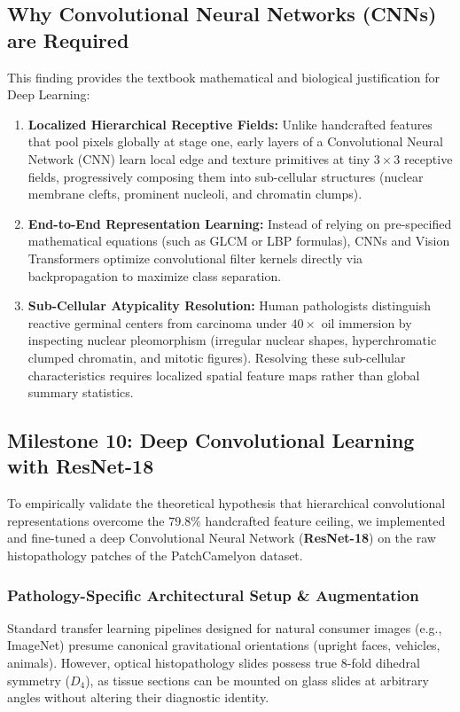 \documentclass[11pt,a4paper]{article}
\begin{document}
\subsection{Why Convolutional Neural Networks (CNNs) are Required}
This finding provides the textbook mathematical and biological justification for Deep Learning:
\begin{enumerate}[noitemsep]
    \item \textbf{Localized Hierarchical Receptive Fields:} Unlike handcrafted features that pool pixels globally at stage one, early layers of a Convolutional Neural Network (CNN) learn local edge and texture primitives at tiny $3 \times 3$ receptive fields, progressively composing them into sub-cellular structures (nuclear membrane clefts, prominent nucleoli, and chromatin clumps).
    \item \textbf{End-to-End Representation Learning:} Instead of relying on pre-specified mathematical equations (such as GLCM or LBP formulas), CNNs and Vision Transformers optimize convolutional filter kernels directly via backpropagation to maximize class separation.
    \item \textbf{Sub-Cellular Atypicality Resolution:} Human pathologists distinguish reactive germinal centers from carcinoma under $40\times$ oil immersion by inspecting nuclear pleomorphism (irregular nuclear shapes, hyperchromatic clumped chromatin, and mitotic figures). Resolving these sub-cellular characteristics requires localized spatial feature maps rather than global summary statistics.
\end{enumerate}

\subsection{Milestone 10: Deep Convolutional Learning with ResNet-18}
\label{sec:milestone10_cnn}
To empirically validate the theoretical hypothesis that hierarchical convolutional representations overcome the $79.8\%$ handcrafted feature ceiling, we implemented and fine-tuned a deep Convolutional Neural Network (\textbf{ResNet-18}) on the raw histopathology patches of the PatchCamelyon dataset.

\subsubsection{Pathology-Specific Architectural Setup \& Augmentation}
Standard transfer learning pipelines designed for natural consumer images (e.g., ImageNet) presume canonical gravitational orientations (upright faces, vehicles, animals). However, optical histopathology slides possess true 8-fold dihedral symmetry ($D_4$), as tissue sections can be mounted on glass slides at arbitrary angles without altering their diagnostic identity.
\end{document}
